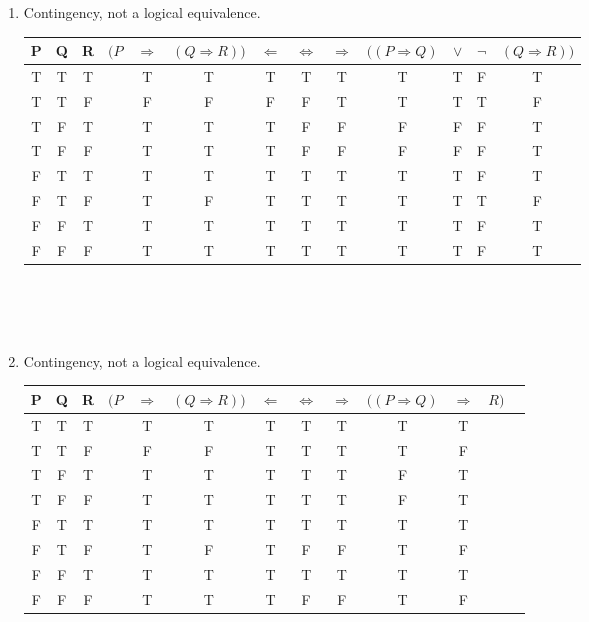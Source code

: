 \documentclass[10pt]{article}
\theoremstyle{plain}
\theoremstyle{definition}
\begin{document}
\begin{enumerate}
\begin{enumerate}
\begin{tabular}{cc|ccccccc|c}
\end{tabular}\\\\\

\item Contingency, not a logical equivalence. 

\begin{tabular}{ccc|cccc|c|ccccc}
P & Q & R & $(P$ & $ \Rightarrow$ & $(Q \Rightarrow R))$ & $\Leftarrow$ & $\Leftrightarrow$ & $\Rightarrow$ & $((P \Rightarrow Q)$ & $ \vee$ & $\neg$ & $(Q \Rightarrow R))$ \\
\hline
T & T & T & & T & T & T & T & T & T & T & F & T\\
T & T & F & & F & F & F & F & T & T & T & T & F\\
T & F & T & & T & T & T & F & F & F & F & F & T\\
T & F & F & & T & T & T & F & F & F & F & F & T\\
\hline
F & T & T & & T & T & T & T & T & T & T & F & T\\
F & T & F & & T & F & T & T & T & T & T & T & F\\
F & F & T & & T & T & T & T & T & T & T & F & T\\
F & F & F & & T & T & T & T & T & T & T& F & T\\


\end{tabular}\\\\\\

\item Contingency, not a logical equivalence. 

\begin{tabular}{ccc|cccc|c|ccccc}
P & Q & R & $(P$ & $ \Rightarrow$ & $(Q \Rightarrow R))$ & $\Leftarrow$ & $\Leftrightarrow$ & $\Rightarrow$ & $((P \Rightarrow Q)$ & $ \Rightarrow$ & $ R)$ \\
\hline
T & T & T & & T & T & T & T & T & T & T \\
T & T & F & & F & F & T & T & T & T & F \\
T & F & T & & T & T & T & T & T & F & T\\
T & F & F & & T & T & T & T & T & F & T\\
\hline
F & T & T & & T & T & T & T & T & T & T\\
F & T & F & & T & F & T & F & F & T & F\\
F & F & T & & T & T & T & T & T & T & T\\
F & F & F & & T & T & T & F & F & T & F\\



\end{tabular}
\end{enumerate}
\end{enumerate}
\end{document}
